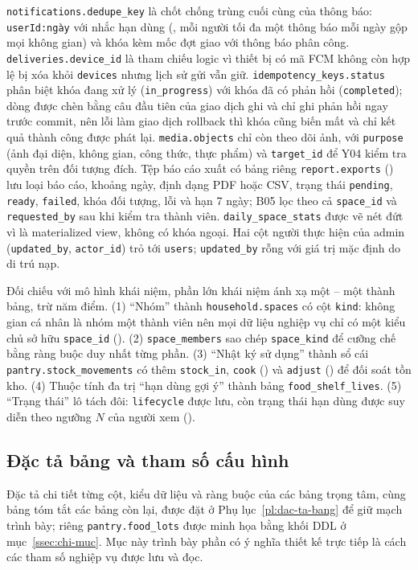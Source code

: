 \texttt{notifications.dedupe\_key} là chốt chống trùng cuối cùng của thông báo: \texttt{userId:ngày} với nhắc hạn dùng (, mỗi người tối đa một thông báo mỗi ngày gộp mọi không gian) và khóa kèm mốc đợt giao với thông báo phân công. \texttt{deliveries.device\_id} là tham chiếu logic vì thiết bị có mã FCM không còn hợp lệ bị xóa khỏi \texttt{devices} nhưng lịch sử gửi vẫn giữ. \texttt{idempotency\_keys.status} phân biệt khóa đang xử lý (\texttt{in\_progress}) với khóa đã có phản hồi (\texttt{completed}); dòng được chèn bằng câu đầu tiên của giao dịch ghi và chỉ ghi phản hồi ngay trước commit, nên lỗi làm giao dịch rollback thì khóa cũng biến mất và chỉ kết quả thành công được phát lại. \texttt{media.objects} chỉ còn theo dõi ảnh, với \texttt{purpose} (ảnh đại diện, không gian, công thức, thực phẩm) và \texttt{target\_id} để Y04 kiểm tra quyền trên đối tượng đích. Tệp báo cáo xuất có bảng riêng \texttt{report.exports} () lưu loại báo cáo, khoảng ngày, định dạng PDF hoặc CSV, trạng thái \texttt{pending}, \texttt{ready}, \texttt{failed}, khóa đối tượng, lỗi và hạn 7 ngày; B05 lọc theo cả \texttt{space\_id} và \texttt{requested\_by} sau khi kiểm tra thành viên. \texttt{daily\_space\_stats} được vẽ nét đứt vì là materialized view, không có khóa ngoại. Hai cột người thực hiện của admin (\texttt{updated\_by}, \texttt{actor\_id}) trỏ tới \texttt{users}; \texttt{updated\_by} rỗng với giá trị mặc định do di trú nạp.

Đối chiếu với mô hình khái niệm, phần lớn khái niệm ánh xạ một -- một thành bảng, trừ năm điểm. (1) “Nhóm” thành \texttt{household.spaces} có cột \texttt{kind}: không gian cá nhân là nhóm một thành viên nên mọi dữ liệu nghiệp vụ chỉ có một kiểu chủ sở hữu \texttt{space\_id} (). (2) \texttt{space\_members} sao chép \texttt{space\_kind} để cưỡng chế  bằng ràng buộc duy nhất từng phần. (3) “Nhật ký sử dụng” thành sổ cái \texttt{pantry.stock\_movements} có thêm \texttt{stock\_in}, \texttt{cook} () và \texttt{adjust} () để đối soát tồn kho. (4) Thuộc tính đa trị “hạn dùng gợi ý” thành bảng \texttt{food\_shelf\_lives}. (5) “Trạng thái” lô tách đôi: \texttt{lifecycle} được lưu, còn trạng thái hạn dùng được suy diễn theo ngưỡng $N$ của người xem ().

\subsection{Đặc tả bảng và tham số cấu hình}\label{ssec:dac-ta-bang}

Đặc tả chi tiết từng cột, kiểu dữ liệu và ràng buộc của các bảng trọng tâm, cùng bảng tóm tắt các bảng còn lại, được đặt ở Phụ lục~\ref{pl:dac-ta-bang} để giữ mạch trình bày; riêng \texttt{pantry.food\_lots} được minh họa bằng khối DDL ở mục~\ref{ssec:chi-muc}. Mục này trình bày phần có ý nghĩa thiết kế trực tiếp là cách các tham số nghiệp vụ được lưu và đọc.

